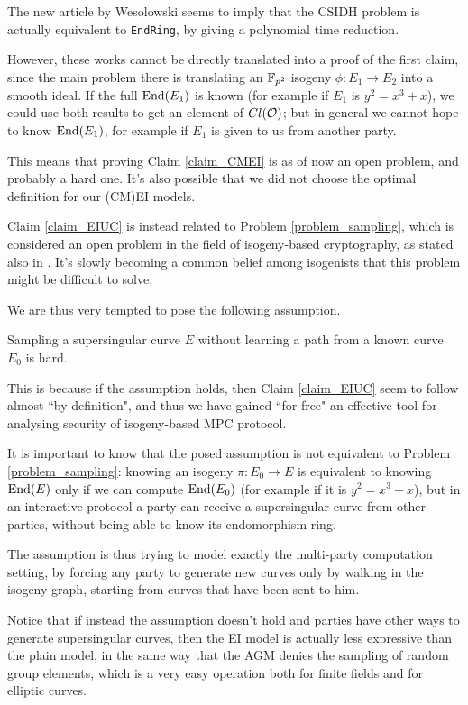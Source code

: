 The new article by Wesolowski \cite{Weso_CSIDH} seems to imply that the CSIDH problem is actually equivalent to \texttt{EndRing}, by giving a polynomial time reduction.

However, these works cannot be directly translated into a proof of the first claim, since the main problem there is translating an $\mathbb{F}_{p^2}$ isogeny $\phi: E_1\to E_2$ into a smooth ideal. If the full $\operatorname{End}(E_1)$ is known (for example if $E_1$ is $y^2=x^3+x$), we could use both results to get an element of $Cl(\mathcal{O})$; but in general we cannot hope to know $\operatorname{End}(E_1)$, for example if $E_1$ is given to us from another party.

This means that proving Claim \ref{claim_CMEI} is as of now an open problem, and probably a hard one. It's also possible that we did not choose the optimal definition for our (CM)EI models.

Claim \ref{claim_EIUC} is instead related to Problem \ref{problem_sampling}, which is considered an open problem in the field of isogeny-based cryptography, as stated also in \cite{CSIDH_EndRing}. It's slowly becoming a common belief among isogenists that this problem might be difficult to solve.

We are thus very tempted to pose the following assumption.

\begin{assumption}
    Sampling a supersingular curve $E$ without learning a path from a known curve $E_0$ is hard.
\end{assumption}

This is because if the assumption holds, then Claim \ref{claim_EIUC} seem to follow almost ``by definition", and thus we have gained ``for free" an effective tool for analysing security of isogeny-based MPC protocol.

It is important to know that the posed assumption is not equivalent to Problem \ref{problem_sampling}: knowing an isogeny $\pi: E_0\to E$ is equivalent to knowing $\operatorname{End}(E)$ only if we can compute $\operatorname{End}(E_0)$ (for example if it is $y^2=x^3+x$), but in an interactive protocol a party can receive a supersingular curve from other parties, without being able to know its endomorphism ring.

The assumption is thus trying to model exactly the multi-party computation setting, by forcing any party to generate new curves only by walking in the isogeny graph, starting from curves that have been sent to him.

Notice that if instead the assumption doesn't hold and parties have other ways to generate supersingular curves, then the EI model is actually less expressive than the plain model, in the same way that the AGM denies the sampling of random group elements, which is a very easy operation both for finite fields and for elliptic curves.

